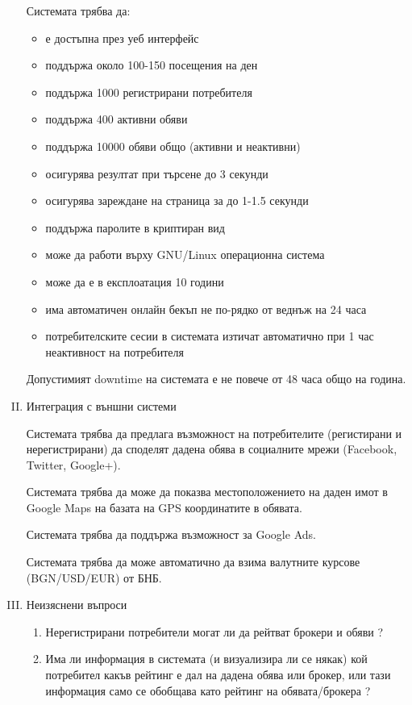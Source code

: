 \documentclass[]{article}
\begin{document}
\begin{enumerate}[I.]
{		Системата трябва да:
		\begin{itemize}
			\item е достъпна през уеб интерфейс
			\item поддържа около 100-150 посещения на ден
			\item поддържа 1000 регистрирани потребителя
			\item поддържа 400 активни обяви
			\item поддържа 10000 обяви общо (активни и неактивни)
			\item осигурява резултат при търсене до 3 секунди
			\item осигурява зареждане на страница за до 1-1.5 секунди
			\item поддържа паролите в криптиран вид
			\item може да работи върху GNU/Linux операционна система
			\item може да е в експлоатация 10 години
			\item има автоматичен онлайн бекъп не по-рядко от веднъж на 24 часа
			\item потребителските сесии в системата изтичат автоматично при 1 час неактивност на потребителя
		\end{itemize}
		
		Допустимият downtime на системата е не повече от 48 часа общо на година.
	}
	
	\item {Интеграция с външни системи

		Системата трябва да предлага възможност на потребителите (регистирани и нерегистрирани) да споделят дадена обява в социалните мрежи (Facebook, Twitter, Google+).

		Системата трябва да може да показва местоположението на даден имот в Google Maps на базата на GPS координатите в обявата.

		Системата трябва да поддържа възможност за Google Ads.

		Системата трябва да може автоматично да взима валутните курсове (BGN/USD/EUR) от БНБ.	
	}
	
	\item {Неизяснени въпроси
		\begin{enumerate}[1.]
			
\item Нерегистрирани потребители могат ли да рейтват брокери и обяви ?
\item Има ли информация в системата (и визуализира ли се някак) кой потребител какъв рейтинг е дал на дадена обява или брокер, или тази информация само се обобщава като рейтинг на обявата/брокера ?
			
		\end{enumerate}
	}
\end{enumerate}
\end{document}
